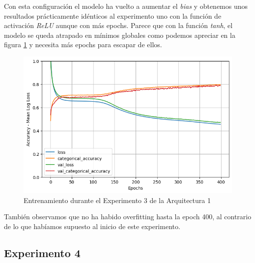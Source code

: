 \documentclass{article}
\begin{document}
			Con esta configuraci\'on el modelo ha vuelto a aumentar el \textit{bias} y obtenemos unos resultados pr\'acticamente id\'enticos al experimento uno con la funci\'on de activaci\'on \textit{ReLU} aunque con m\'as epochs. Parece que con la funci\'on \textit{tanh}, el modelo se queda atrapado en m\'inimos globales como podemos apreciar en la figura \ref{tr-a1-e2} y necesita m\'as epochs para escapar de ellos.\\
			\begin{figure}[!h]
				\begin{center}
					\includegraphics[scale=0.5]{tr-a1-e3.png}		
					\caption{Entrenamiento durante el Experimento 3 de la Arquitectura 1}	
					\label{tr-a1-e2}
				\end{center}
			\end{figure}
			Tambi\'en observamos que no ha habido overfitting hasta la epoch 400, al contrario de lo que hab\'iamos supuesto al inicio de este experimento.
			
		\subsection{Experimento 4}
			
\end{document}

